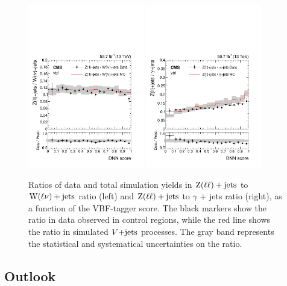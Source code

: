 \begin{figure}[htbp]
    \centering
    \includegraphics[width=0.45\textwidth]{VBFML/combined_combinedW_cat_vbf_2018_2018ratio.pdf}
    \includegraphics[width=0.45\textwidth]{VBFML/combined_gjets_cat_vbf_2018_2018ratio.pdf}
    \caption{Ratios of data and total simulation yields in $\mathrm{Z}(\ell\ell)+\textrm{jets}$ to $\textrm{W}(\ell\nu)+\textrm{jets}$ ratio (left) and
    $\mathrm{Z}(\ell\ell)+\textrm{jets}$ to $\gamma$ + jets ratio (right), as a function of the VBF-tagger score. The black markers
    show the ratio in data observed in control regions, while the red line shows the ratio in simulated
    $V\text{+jets}$ processes. The gray band represents the statistical and systematical uncertainties on the ratio.}
    \label{fig:cr_ratios_dnn_score}
\end{figure}

\subsection{Outlook}

